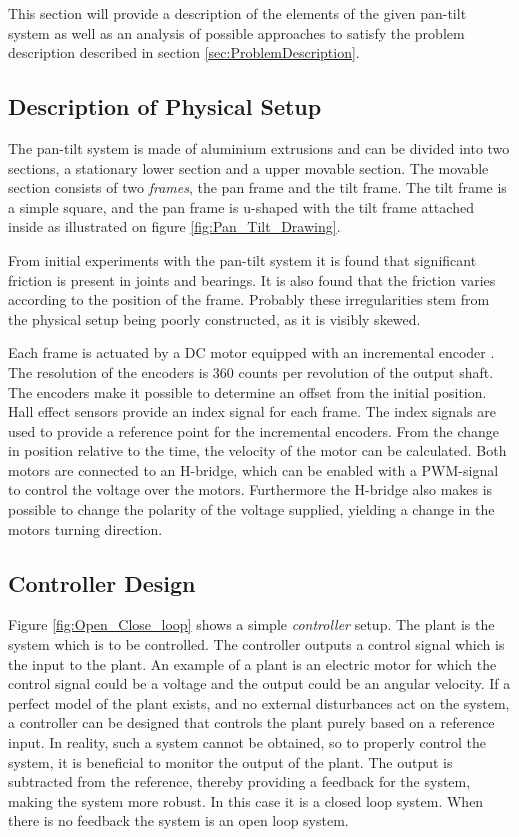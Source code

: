 \documentclass[../../main.tex]{subfiles}
\begin{document}
This section will provide a description of the elements of the given pan-tilt system as well as an analysis of possible approaches to satisfy the problem description described in section \ref{sec:ProblemDescription}.

\subsection{Description of Physical Setup}
The pan-tilt system is made of aluminium extrusions and can be divided into two sections, a stationary lower section and a upper movable section. The movable section consists of two \textit{frames}, the pan frame and the tilt frame. The tilt frame is a simple square, and the pan frame is u-shaped with the tilt frame attached inside as illustrated on figure \ref{fig:Pan_Tilt_Drawing}.

From initial experiments with the pan-tilt system it is found that significant friction is present in joints and bearings. It is also found that the friction varies according to the position of the frame. Probably these irregularities stem from the physical setup being poorly constructed, as it is visibly skewed.  

Each frame is actuated by a DC motor equipped with an incremental encoder \cite{}. The resolution of the encoders is 360 counts per revolution of the output shaft. The encoders make it possible to determine an offset from the initial position. Hall effect sensors \cite{} provide an index signal for each frame. The index signals are used to provide a reference point for the incremental encoders. From the change in position relative to the time, the velocity of the motor can be calculated. Both motors are connected to an H-bridge, which can be enabled with a PWM-signal to control the voltage over the motors. Furthermore the H-bridge also makes is possible to change the polarity of the voltage supplied, yielding a change in the motors turning direction.

\subsection{Controller Design}

Figure \ref{fig:Open_Close_loop} shows a simple \textit{controller} setup.
The plant is the system which is to be controlled. The controller outputs a control signal which is the input to the plant. 
An example of a plant is an electric motor for which the control signal could be a voltage and the output could be an angular velocity.
If a perfect model of the plant exists, and no external disturbances act on the system, a controller can be designed that controls the plant purely based on a reference input. In reality, such a system cannot be obtained, so to properly control the system, it is beneficial to monitor the output of the plant. The output is subtracted from the reference, thereby providing a feedback for the system, making the system more robust. In this case it is a closed loop system. When there is no feedback the system is an open loop system.  
\end{document}
